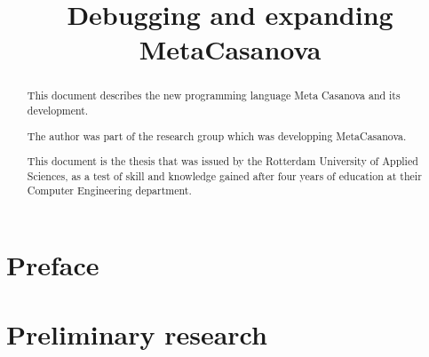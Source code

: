 


\title{Debugging and expanding MetaCasanova}
\author{\writer}

\begin{titlepage}
   
\end{titlepage}


\cleardoublepage
\begin{abstract}
   This document describes the new programming language Meta Casanova and its development.

   The author was part of the research group which was developping MetaCasanova.

   This document is the thesis that was issued by the Rotterdam University of Applied Sciences, as a test of skill and knowledge gained after four years of education at their Computer Engineering department.
\end{abstract}
\cleardoublepage


\setcounter{tocdepth}{1}
\pagestyle{contents}
\tableofcontents
\cleardoublepage

\pagestyle{mine}

\part{Preface}
\cleardoublepage

\cleardoublepage

\part{Preliminary research}
\cleardoublepage


\cleardoublepage


\cleardoublepage

